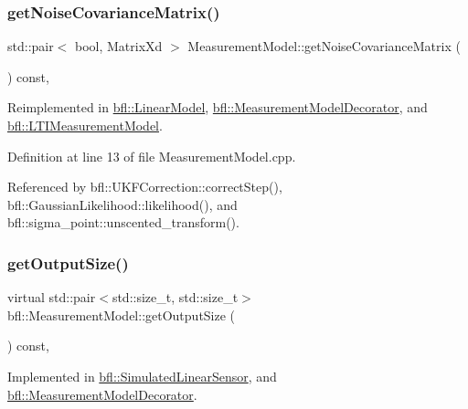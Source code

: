 \subsubsection{\texorpdfstring{get\+Noise\+Covariance\+Matrix()}{getNoiseCovarianceMatrix()}}
{\footnotesize\ttfamily std\+::pair$<$ bool, Matrix\+Xd $>$ Measurement\+Model\+::get\+Noise\+Covariance\+Matrix (\begin{DoxyParamCaption}{ }\end{DoxyParamCaption}) const\hspace{0.3cm}{\ttfamily [virtual]}, {\ttfamily [inherited]}}



Reimplemented in \mbox{\hyperlink{classbfl_1_1LinearModel_a9adc7aabd58e79ce71c283866ddbf655}{bfl\+::\+Linear\+Model}}, \mbox{\hyperlink{classbfl_1_1MeasurementModelDecorator_a690917b537b72bd6278968bbd5b030b0}{bfl\+::\+Measurement\+Model\+Decorator}}, and \mbox{\hyperlink{classbfl_1_1LTIMeasurementModel_a227ed150a9fdcb2b5b59f7b71eb7e462}{bfl\+::\+L\+T\+I\+Measurement\+Model}}.



Definition at line 13 of file Measurement\+Model.\+cpp.



Referenced by bfl\+::\+U\+K\+F\+Correction\+::correct\+Step(), bfl\+::\+Gaussian\+Likelihood\+::likelihood(), and bfl\+::sigma\+\_\+point\+::unscented\+\_\+transform().

\mbox{\label{classbfl_1_1MeasurementModel_a6cca2022b576c9dbb61e73b83a10c6ee}} 
\subsubsection{\texorpdfstring{get\+Output\+Size()}{getOutputSize()}}
{\footnotesize\ttfamily virtual std\+::pair$<$std\+::size\+\_\+t, std\+::size\+\_\+t$>$ bfl\+::\+Measurement\+Model\+::get\+Output\+Size (\begin{DoxyParamCaption}{ }\end{DoxyParamCaption}) const\hspace{0.3cm}{\ttfamily [pure virtual]}, {\ttfamily [inherited]}}



Implemented in \mbox{\hyperlink{classbfl_1_1SimulatedLinearSensor_a00e869da2b16b5ead1d76a7b32e9fc4b}{bfl\+::\+Simulated\+Linear\+Sensor}}, and \mbox{\hyperlink{classbfl_1_1MeasurementModelDecorator_a9522d1549c62f55a59401f6fa53421e8}{bfl\+::\+Measurement\+Model\+Decorator}}.



